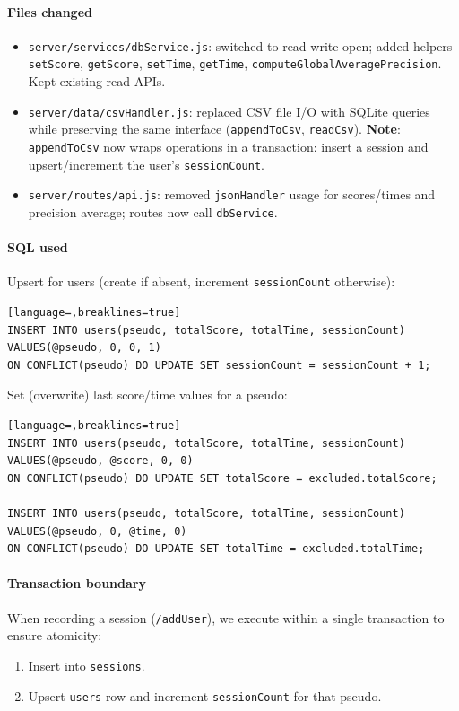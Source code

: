 \documentclass[11pt,a4paper]{article}
\begin{document}
\paragraph{Files changed}
\begin{itemize}[noitemsep]
  \item \texttt{server/services/dbService.js}: switched to read-write open; added helpers \texttt{setScore}, \texttt{getScore}, \texttt{setTime}, \texttt{getTime}, \texttt{computeGlobalAveragePrecision}. Kept existing read APIs.
  \item \texttt{server/data/csvHandler.js}: replaced CSV file I/O with SQLite queries while preserving the same interface (\texttt{appendToCsv}, \texttt{readCsv}). \textbf{Note}: \texttt{appendToCsv} now wraps operations in a transaction: insert a session and upsert/increment the user's \texttt{sessionCount}.
  \item \texttt{server/routes/api.js}: removed \texttt{jsonHandler} usage for scores/times and precision average; routes now call \texttt{dbService}.
\end{itemize}

\paragraph{SQL used}
Upsert for users (create if absent, increment \texttt{sessionCount} otherwise):
\begin{lstlisting}[language=,breaklines=true]
INSERT INTO users(pseudo, totalScore, totalTime, sessionCount)
VALUES(@pseudo, 0, 0, 1)
ON CONFLICT(pseudo) DO UPDATE SET sessionCount = sessionCount + 1;
\end{lstlisting}

Set (overwrite) last score/time values for a pseudo:
\begin{lstlisting}[language=,breaklines=true]
INSERT INTO users(pseudo, totalScore, totalTime, sessionCount)
VALUES(@pseudo, @score, 0, 0)
ON CONFLICT(pseudo) DO UPDATE SET totalScore = excluded.totalScore;

INSERT INTO users(pseudo, totalScore, totalTime, sessionCount)
VALUES(@pseudo, 0, @time, 0)
ON CONFLICT(pseudo) DO UPDATE SET totalTime = excluded.totalTime;
\end{lstlisting}

\paragraph{Transaction boundary}
When recording a session (\texttt{/addUser}), we execute within a single transaction to ensure atomicity:
\begin{enumerate}[noitemsep]
  \item Insert into \texttt{sessions}.
  \item Upsert \texttt{users} row and increment \texttt{sessionCount} for that pseudo.
\end{enumerate}
\end{document}
